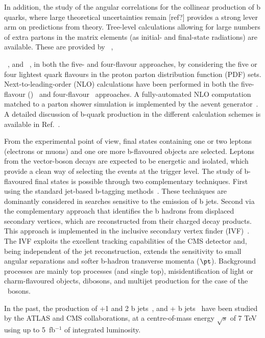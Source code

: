 In addition, the study of the angular correlations for the collinear
production of b quarks, where large theoretical uncertainties remain
[ref?]  provides a strong lever arm on predictions from
theory. Tree-level calculations allowing for large numbers of extra
partons in the matrix elements (as initial- and final-state
radiations) are available. These are provided by
\MADGRAPH~\cite{Alwall:2007st,Alwall:2011uj}, 
{\ALPGEN~\cite{alpgen}, and \SHERPA~\cite{Gleisberg:2008ta},
in both the five- and four-flavour approaches, \ie by considering the
five or four lightest quark flavours in the proton parton distribution
function (PDF) sets. Next-to-leading-order (NLO) calculations have
been performed in both the five-flavour (\MCFM)~\cite{Campbell:2000bg}
and four-flavour~\cite{FebresCordero:2008ci,Cordero:2009kv}
approaches. A fully-automated NLO computation matched to a parton
shower simulation is implemented by the a\MCATNLO event
generator~\cite{Frederix:2011qg,Frixione:2002ik}. A detailed
discussion of b-quark production in the different calculation schemes
is available in Ref.~\cite{Maltoni:2012pa}.

From the experimental point of view, final states containing one or
two leptons (electrons or muons) and one ore more b-flavoured objects
are selected. Leptons from the vector-boson decays are expected to be
energetic and isolated, which provide a clean way of selecting the
events at the trigger level. The study of b-flavoured final states is
possible through two complementary techniques. First using the
standard jet-based b-tagging methods~\cite{Chatrchyan:2012jua}. These
techniques are dominantly considered in searches sensitive to the
emission of b jets. Second via the complementary approach that
identifies the b hadrons from displaced secondary vertices, which are
reconstructed from their charged decay products. This approach is
implemented in the inclusive secondary vertex finder
(IVF)~\cite{Khachatryan:2011wq}. The IVF exploits the excellent
tracking capabilities of the CMS detector and, being independent of
the jet reconstruction, extends the sensitivity to small angular
separations and softer b-hadron transverse momenta ($\pt$). Background
processes are mainly top processes (\ttbar and single top),
misidentification of light or charm-flavoured objects, dibosons, and
multijet production for the case of the \Wpm\ bosons.
 
In the past, the production of \cPZ+1 and 2 b
jets~\cite{Chatrchyan:2012vr,Chatrchyan:2014dha,Chatrchyan:2013zja,Aad:2011jn,Aad:2014dvb},
and \Wpm+ b jets~\cite{Chatrchyan:2013uza,Aad:2013vka} have been
studied by the ATLAS and CMS collaborations, at a centre-of-mass
energy $\sqrt{s}$ of 7 TeV using up to 5~fb$^{-1}$ of integrated
luminosity.

}
